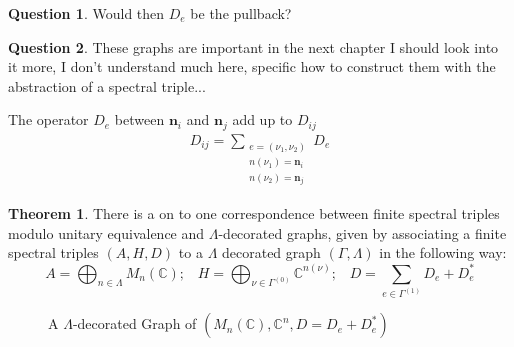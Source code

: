 \documentclass[a4paper]{article}
\theoremstyle{definition}
\theoremstyle{definition}
\newtheorem{question}{Question}
\theoremstyle{definition}
\theoremstyle{theorem}
\newtheorem{theorem}{Theorem}
\theoremstyle{theorem}
\begin{document}
\begin{question}
    Would then $D_e$ be the pullback?
\end{question}
\begin{question}
    These graphs are important in the next chapter I should look
    into it more, I don't understand much here, specific
    how to construct them with the abstraction of a spectral triple...
\end{question}

The operator $D_e$ between $\textbf{n}_i$ and $\textbf{n}_j$ add up to
$D_{ij}$
\begin{align*}
    D_{ij} = \sum\limits_{\substack{e = (\nu _1, \nu _2) \\ n(\nu _1) =
    \textbf{n}_i \\ n(\nu _2) = \textbf{n}_j}} D_e
\end{align*}

\begin{theorem}
    There is a on to one correspondence between finite spectral triples
    modulo unitary equivalence and $\Lambda$-decorated graphs, given by
    associating a finite spectral triples $(A, H, D)$ to  a $\Lambda$ decorated
    graph $(\Gamma, \Lambda)$ in the following way:
    \begin{equation}
        A = \bigoplus _{n\in \Lambda} M_n(\mathbb{C}); \;\;\;
        H = \bigoplus _{\nu \in \Gamma ^{(0)}} \mathbb{C}^{n(\nu)}; \;\;\;
        D = \sum _{e \in \Gamma ^{(1)}} D_e + D_e^*
    \end{equation}
\end{theorem}
    \begin{figure}[h!]
    \centering
    \caption{A $\Lambda$-decorated Graph of $(M_n(\mathbb{C}), \mathbb{C}^n,
    D = D_e + D_e^*)$}
\end{figure}
\end{document}
